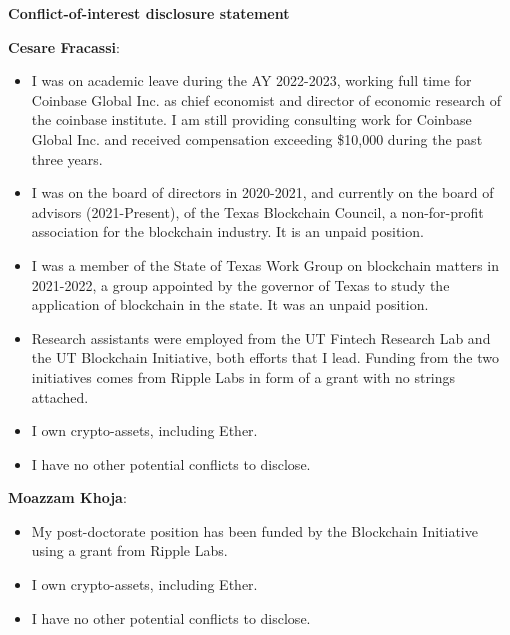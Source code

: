 \documentclass[12pt, letter paper]{article}
\begin{document}
\begin{center}
    \textbf{Conflict-of-interest disclosure statement}
\end{center}

\vspace{2cm}
\textbf{Cesare Fracassi}: 
\begin{itemize}
    \item I was on academic leave during the AY 2022-2023, working full time for Coinbase Global Inc. as chief economist and director of economic research of the coinbase institute. I am still providing consulting work for Coinbase Global Inc. and received compensation exceeding \$10,000 during the past three years.
    \item I was on the board of directors in 2020-2021, and currently on the board of advisors (2021-Present), of the Texas Blockchain Council, a non-for-profit association for the blockchain industry. It is an unpaid position. 
    \item I was a member of the State of Texas Work Group on blockchain matters in 2021-2022, a group appointed by the governor of Texas to study the application of blockchain in the state. It was an unpaid position. 
    \item Research assistants were employed from the UT Fintech Research Lab and the UT Blockchain Initiative, both efforts that I lead. Funding from the two initiatives comes from Ripple Labs in form of a grant with no strings attached. 
    \item I own crypto-assets, including Ether. 
    \item I have no other potential conflicts to disclose.
\end{itemize}

\textbf{Moazzam Khoja}: 
\begin{itemize}
    \item My post-doctorate position has been funded by the Blockchain Initiative using a grant from Ripple Labs. 
    \item I own crypto-assets, including Ether. 
    \item I have no other potential conflicts to disclose.
\end{itemize}
    
\end{document}
